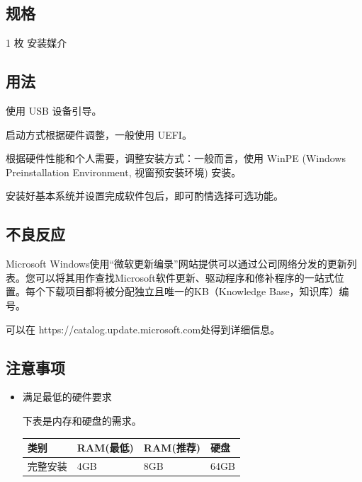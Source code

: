 \documentclass{article}
\begin{document}
\begin{multicols*}{3}
	\begin{tcolorbox}
	\section*{规格}
	\end{tcolorbox}

	1 枚 安装媒介

	\medskip

	\begin{tcolorbox}
	\section*{用法}
	\end{tcolorbox}

	使用 USB 设备引导。

	启动方式根据硬件调整，一般使用 UEFI。

	根据硬件性能和个人需要，调整安装方式：一般而言，使用 WinPE (Windows Preinstallation  Environment, 视窗预安装环境) 安装。

	安装好基本系统并设置完成软件包后，即可酌情选择可选功能。

	\medskip

	\begin{tcolorbox}
	\section*{不良反应}
	\end{tcolorbox}

	Microsoft Windows使用“微软更新编录”网站提供可以通过公司网络分发的更新列表。您可以将其用作查找Microsoft软件更新、驱动程序和修补程序的一站式位置。每个下载项目都将被分配独立且唯一的KB（Knowledge Base，知识库）编号。

	可以在 https://catalog.update.microsoft.com处得到详细信息。

	\medskip


	\begin{tcolorbox}
	\section*{注意事项}
	\end{tcolorbox}
	\begin{itemize}[leftmargin=*]

		\item 满足最低的硬件要求

		下表是内存和硬盘的需求。

		{\small\begin{tabularx}{\linewidth}{|X|X|X|X|}
			\hline
			类别 & RAM\newline (最低) & RAM\newline (推荐) & 硬盘 \\
			\hline
			完整安装 & 4GB & 8GB & 64GB \\
			\hline
		\end{tabularx}}


\end{itemize}
\end{multicols*}
\end{document}
